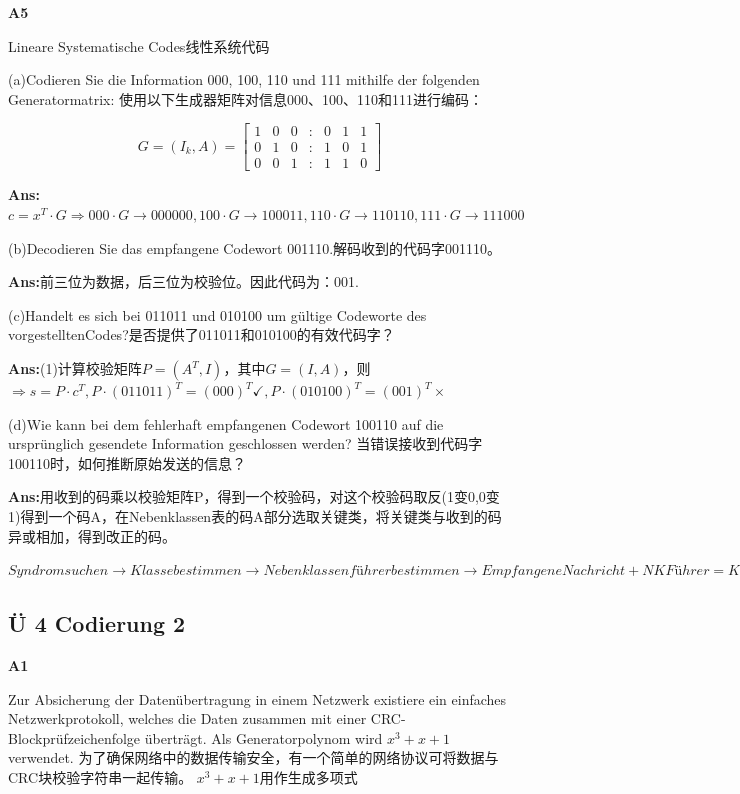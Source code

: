 \documentclass[fleqn]{article}
\begin{document}
\noindent\textbf{A5}

Lineare Systematische Codes线性系统代码

(a)Codieren Sie die Information 000, 100, 110 und 111 mithilfe der folgenden Generatormatrix:
使用以下生成器矩阵对信息000、100、110和111进行编码：

$$G=(I_k,A)=\begin{bmatrix}
    1&0&0&:&0&1&1\\
    0&1&0&:&1&0&1\\
    0&0&1&:&1&1&0
\end{bmatrix}$$

\textbf{Ans:}$c=x^T\cdot G\Rightarrow 000\cdot G\rightarrow 000000,100\cdot G\rightarrow 100011,110\cdot G\rightarrow 110110,111\cdot G\rightarrow 111000$

(b)Decodieren Sie das empfangene Codewort 001110.解码收到的代码字001110。

\textbf{Ans:}前三位为数据，后三位为校验位。因此代码为：001.

(c)Handelt es sich bei 011011 und 010100 um gültige Codeworte des vorgestelltenCodes?是否提供了011011和010100的有效代码字？

\textbf{Ans:}(1)计算校验矩阵$P=(A^T,I)$，其中$G=(I,A)$，则$\Rightarrow s=P\cdot c^T,P\cdot(011011)^T =(000)^T\checkmark,P\cdot(010100)^T=(001)^T\times$

(d)Wie kann bei dem fehlerhaft empfangenen Codewort 100110 auf die ursprünglich gesendete Information geschlossen werden?
当错误接收到代码字100110时，如何推断原始发送的信息？

\textbf{Ans:}用收到的码乘以校验矩阵P，得到一个校验码，对这个校验码取反(1变0,0变1)得到一个码A，在Nebenklassen表的码A部分选取关键类，将关键类与收到的码异或相加，得到改正的码。

$Syndrom suchen \rightarrow Klasse bestimmen \rightarrow Nebenklassenführer bestimmen \rightarrow Empfangene Nachricht + NK Führer = Korrigiertes Codewort$ 

\subsection{Ü 4 Codierung 2}

\noindent\textbf{A1}

Zur Absicherung der Datenübertragung in einem Netzwerk existiere ein einfaches Netzwerkprotokoll, welches die Daten zusammen mit einer CRC-Blockprüfzeichenfolge überträgt. Als Generatorpolynom wird $x^3+x+1$ verwendet.
为了确保网络中的数据传输安全，有一个简单的网络协议可将数据与CRC块校验字符串一起传输。 $ x ^ 3 + x + 1 $用作生成多项式
\end{document}
